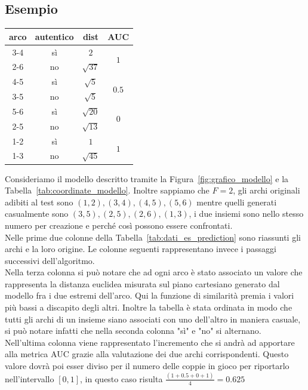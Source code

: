 \subsection{Esempio}
\begin{center}
	\begin{tabular}{|c|c|c|c|}
		\hline
		arco & autentico & dist & AUC\\
		\hline
		3-4 & sì & $2$ & \multirow{2}{*}{$1$}\\
		2-6 & no & $\sqrt{37}$ & \\
		\hline
		4-5 & sì & $\sqrt{5}$ & \multirow{2}{*}{$0.5$}\\
		3-5 & no & $\sqrt{5}$ & \\
		\hline
		5-6 & sì & $\sqrt{20}$ & \multirow{2}{*}{$0$}\\
		2-5 & no & $\sqrt{13}$ & \\
		\hline
		1-2 & sì & $1$ & \multirow{2}{*}{$1$}\\
		1-3 & no & $\sqrt{45}$ & \\
		\hline
	\end{tabular}
	\label{tab:dati_es_prediction}
\end{center}
Consideriamo il modello descritto tramite la Figura~\ref{fig:grafico_modello} e la Tabella~\ref{tab:coordinate_modello}. Inoltre sappiamo che $F=2$, gli archi originali adibiti al test sono $(1, 2), (3, 4), (4, 5), (5, 6)$ mentre quelli generati casualmente sono $(3, 5), (2, 5), (2, 6), (1, 3)$, i due insiemi sono nello stesso numero per creazione e perché così possono essere confrontati.\\
Nelle prime due colonne della Tabella~\ref{tab:dati_es_prediction} sono riassunti gli archi e la loro origine. Le colonne seguenti rappresentano invece i passaggi successivi dell'algoritmo.\\
Nella terza colonna si può notare che ad ogni arco è stato associato un valore che rappresenta la distanza euclidea misurata sul piano cartesiano generato dal modello fra i due estremi dell'arco. Qui la funzione di similarità premia i valori più bassi a discapito degli altri. Inoltre la tabella è stata ordinata in modo che tutti gli archi di un insieme siano associati con uno dell'altro in maniera casuale, si può notare  infatti che nella seconda colonna "sì" e "no" si alternano.\\
Nell'ultima colonna viene rappresentato l'incremento che si andrà ad apportare alla metrica AUC grazie alla valutazione dei due archi corrispondenti. Questo valore dovrà poi esser diviso per il numero delle coppie in gioco per riportarlo nell'intervallo $[0, 1]$, in questo caso risulta $\displaystyle \frac{\left( 1+0.5+0+1 \right)}{4} = 0.625$\\
